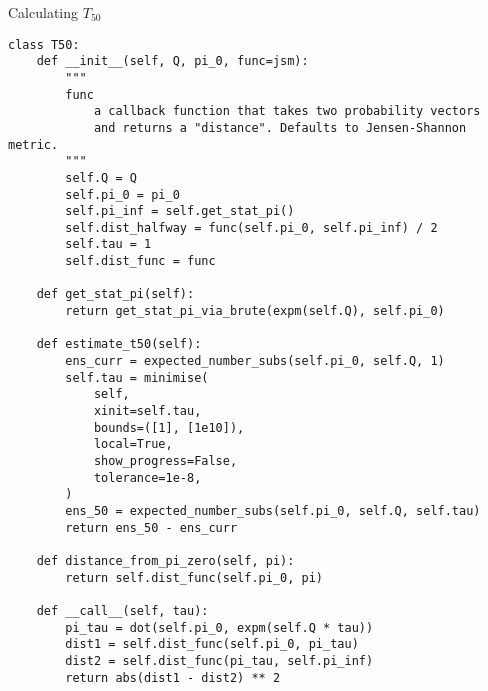 \begin{algorithm}[ht!]
\caption[Algorithm]{Calculating $T_{50}$}
\label{alg:t50}
\begin{verbatim}
class T50:
    def __init__(self, Q, pi_0, func=jsm):
        """
        func
            a callback function that takes two probability vectors
            and returns a "distance". Defaults to Jensen-Shannon metric.
        """
        self.Q = Q
        self.pi_0 = pi_0
        self.pi_inf = self.get_stat_pi()
        self.dist_halfway = func(self.pi_0, self.pi_inf) / 2
        self.tau = 1
        self.dist_func = func

    def get_stat_pi(self):
        return get_stat_pi_via_brute(expm(self.Q), self.pi_0)

    def estimate_t50(self):
        ens_curr = expected_number_subs(self.pi_0, self.Q, 1)
        self.tau = minimise(
            self,
            xinit=self.tau,
            bounds=([1], [1e10]),
            local=True,
            show_progress=False,
            tolerance=1e-8,
        )
        ens_50 = expected_number_subs(self.pi_0, self.Q, self.tau)
        return ens_50 - ens_curr

    def distance_from_pi_zero(self, pi):
        return self.dist_func(self.pi_0, pi)

    def __call__(self, tau):
        pi_tau = dot(self.pi_0, expm(self.Q * tau))
        dist1 = self.dist_func(self.pi_0, pi_tau)
        dist2 = self.dist_func(pi_tau, self.pi_inf)
        return abs(dist1 - dist2) ** 2
\end{verbatim}
\end{algorithm}
